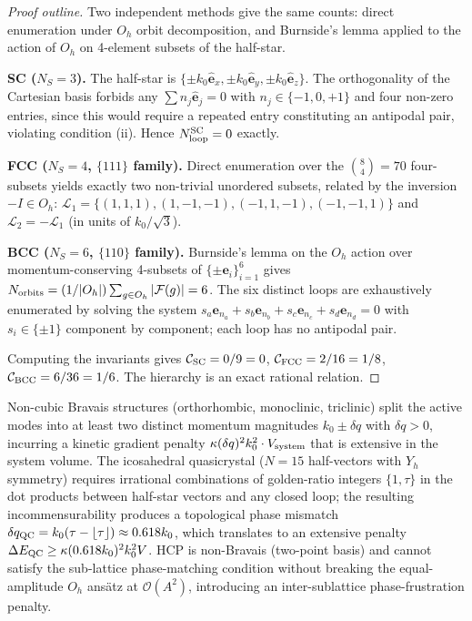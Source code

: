 \begin{proof}[Proof outline]
Two independent methods give the same counts: direct enumeration
under $O_h$ orbit decomposition, and Burnside's lemma applied to the
action of $O_h$ on 4-element subsets of the half-star.

\textbf{SC ($N_S = 3$).} The half-star is
$\{\pm k_0 \hat{\mathbf{e}}_x, \pm k_0 \hat{\mathbf{e}}_y, \pm k_0
\hat{\mathbf{e}}_z\}$. The orthogonality of the Cartesian basis
forbids any $\sum n_j \hat{\mathbf{e}}_j = 0$ with $n_j \in \{-1,0,+1\}$
and four non-zero entries, since this would require a repeated entry
constituting an antipodal pair, violating condition (ii). Hence
$N_{\rm loop}^{\rm SC} = 0$ exactly.

\textbf{FCC ($N_S = 4$, $\{111\}$ family).} Direct enumeration over
the $\binom{8}{4} = 70$ four-subsets yields exactly two non-trivial
unordered subsets, related by the inversion $-I \in O_h$:
$\mathcal{L}_1 = \{(1,1,1),(1,-1,-1),(-1,1,-1),(-1,-1,1)\}$ and
$\mathcal{L}_2 = -\mathcal{L}_1$ (in units of $k_0/\sqrt{3}$).

\textbf{BCC ($N_S = 6$, $\{110\}$ family).} Burnside's lemma on the
$O_h$ action over momentum-conserving 4-subsets of $\{\pm
\mathbf{e}_i\}_{i=1}^6$ gives $N_{\rm orbits} = (1/|O_h|)
\sum_{g \in O_h} |\mathcal{F}(g)| = 6$. The six distinct loops are
exhaustively enumerated by solving the system $s_a \mathbf{e}_{n_a} +
s_b \mathbf{e}_{n_b} + s_c \mathbf{e}_{n_c} + s_d \mathbf{e}_{n_d} = 0$
with $s_i \in \{\pm 1\}$ component by component; each loop has no
antipodal pair.

Computing the invariants gives $\mathcal{C}_{\rm SC} = 0/9 = 0$,
$\mathcal{C}_{\rm FCC} = 2/16 = 1/8$, $\mathcal{C}_{\rm BCC} = 6/36 = 1/6$.
The hierarchy is an exact rational relation.
\end{proof}

\begin{remark}
\label{rem:exclusion}
Non-cubic Bravais structures (orthorhombic, monoclinic, triclinic)
split the active modes into at least two distinct momentum magnitudes
$k_0 \pm \delta q$ with $\delta q > 0$, incurring a kinetic gradient
penalty $\kappa(\delta q)^2 k_0^2 \cdot V_{\rm system}$ that is
extensive in the system volume. The icosahedral quasicrystal
($N = 15$ half-vectors with $Y_h$ symmetry) requires irrational
combinations of golden-ratio integers $\{1,\tau\}$ in the dot products
between half-star vectors and any closed loop; the resulting
incommensurability produces a topological phase mismatch
$\delta q_{\rm QC} = k_0 (\tau - \lfloor \tau \rfloor) \approx 0.618
k_0$, which translates to an extensive penalty $\Delta E_{\rm QC}
\geq \kappa (0.618 k_0)^2 k_0^2 V$. HCP is non-Bravais (two-point
basis) and cannot satisfy the sub-lattice phase-matching condition
without breaking the equal-amplitude $O_h$ ans\"atz at
$\mathcal{O}(A^2)$, introducing an inter-sublattice phase-frustration
penalty.
\end{remark}

